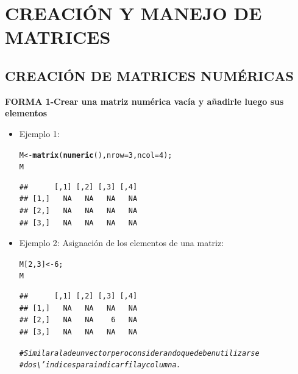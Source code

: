 \documentclass[12pt,letterpaper]{article}\usepackage[]{graphicx}\usepackage[]{color}
\makeatletter
\newcommand{\hlnum}[1]{\textcolor[rgb]{0.686,0.059,0.569}{#1}}%
\newcommand{\hlcom}[1]{\textcolor[rgb]{0.678,0.584,0.686}{\textit{#1}}}%
\newcommand{\hlstd}[1]{\textcolor[rgb]{0.345,0.345,0.345}{#1}}%
\newcommand{\hlkwb}[1]{\textcolor[rgb]{0.69,0.353,0.396}{#1}}%
\newcommand{\hlkwc}[1]{\textcolor[rgb]{0.333,0.667,0.333}{#1}}%
\newcommand{\hlkwd}[1]{\textcolor[rgb]{0.737,0.353,0.396}{\textbf{#1}}}%
\newenvironment{kframe}{%
 \def\at@end@of@kframe{}%
 \ifinner\ifhmode%
  \def\at@end@of@kframe{\end{minipage}}%
  \begin{minipage}{\columnwidth}%
 \fi\fi%
 \def\FrameCommand##1{\hskip\@totalleftmargin \hskip-\fboxsep
 \colorbox{shadecolor}{##1}\hskip-\fboxsep
     \hskip-\linewidth \hskip-\@totalleftmargin \hskip\columnwidth}%
 \MakeFramed {\advance\hsize-\width
   \@totalleftmargin\z@ \linewidth\hsize
   \@setminipage}}%
 {\par\unskip\endMakeFramed%
 \at@end@of@kframe}
\newenvironment{knitrout}{}{} %
\makeatother
\begin{document}
\section{CREACI\'ON Y MANEJO DE MATRICES}
\subsection{CREACI\'ON DE MATRICES NUM\'ERICAS}
\textbf {FORMA 1-Crear una matriz num\'erica vac\'ia y a\~nadirle luego sus elementos}
\begin{itemize}
\item Ejemplo 1:
\begin{knitrout}
\color{fgcolor}\begin{kframe}
\begin{alltt}
\hlstd{M} \hlkwb{<-} \hlkwd{matrix}\hlstd{(}\hlkwd{numeric}\hlstd{(),} \hlkwc{nrow} \hlstd{=} \hlnum{3}\hlstd{,} \hlkwc{ncol}\hlstd{=}\hlnum{4}\hlstd{);}
\hlstd{M}
\end{alltt}
\begin{verbatim}
##      [,1] [,2] [,3] [,4]
## [1,]   NA   NA   NA   NA
## [2,]   NA   NA   NA   NA
## [3,]   NA   NA   NA   NA
\end{verbatim}
\end{kframe}
\end{knitrout}
\item Ejemplo 2: Asignaci\'on de los elementos de una matriz:
\begin{knitrout}
\color{fgcolor}\begin{kframe}
\begin{alltt}
\hlstd{M[}\hlnum{2}\hlstd{,}\hlnum{3}\hlstd{]} \hlkwb{<-} \hlnum{6}\hlstd{;}
\hlstd{M}
\end{alltt}
\begin{verbatim}
##      [,1] [,2] [,3] [,4]
## [1,]   NA   NA   NA   NA
## [2,]   NA   NA    6   NA
## [3,]   NA   NA   NA   NA
\end{verbatim}
\begin{alltt}
\hlcom{# Similar a la de un vector pero considerando que deben utilizarse }
\hlcom{#dos \textbackslash{}'indices para indicar fila y columna.}
\end{alltt}
\end{kframe}
\end{knitrout}
\end{itemize}
\end{document}
